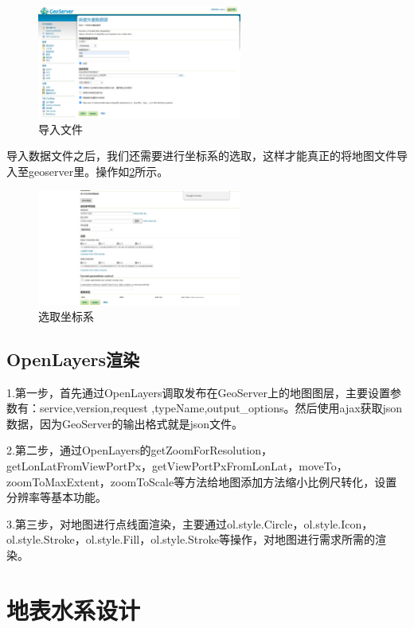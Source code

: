 \begin{figure}[!htb]%
	\centering
	\includegraphics[width=0.60\textwidth]{figs/添加文件.png}
	\caption{导入文件}
	\label{fig:tianjiawenjian}
\end{figure}
导入数据文件之后，我们还需要进行坐标系的选取，这样才能真正的将地图文件导入至geoserver里。操作如\ref{fig:zuobiaoxi}所示。
\begin{figure}[!htb]%
	\centering
	\includegraphics[width=0.60\textwidth,height=0.2\textheight]{figs/zuobiaoxi.png}
	\caption{选取坐标系}
	\label{fig:zuobiaoxi}
\end{figure}
\subsection{OpenLayers渲染}
1.第一步，首先通过OpenLayers调取发布在GeoServer上的地图图层，主要设置参数有：service,version,request ,typeName,output\_options。然后使用ajax获取json数据，因为GeoServer的输出格式就是json文件。

2.第二步，通过OpenLayers的getZoomForResolution，getLonLatFromViewPortPx，getViewPortPxFromLonLat，moveTo，zoomToMaxExtent，zoomToScale等方法给地图添加方法缩小比例尺转化，设置分辨率等基本功能。

3.第三步，对地图进行点线面渲染，主要通过ol.style.Circle，ol.style.Icon，ol.style.Stroke，ol.style.Fill，ol.style.Stroke等操作，对地图进行需求所需的渲染。

\section{地表水系设计}


